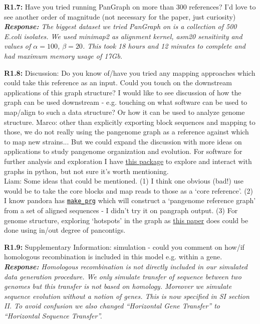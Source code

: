\documentclass[aps,rmp,onecolumn]{revtex4-1}
\newcommand{\Marco}[1]{{\color{gray}Marco: #1}}
\newcommand{\Liam}[1]{{\color{teal}Liam: #1}}
\newcommand{\reviewer}[2]{\textbf{#1:} #2\vskip 5mm}
\newcommand{\response}[1]{{\it {\color{response}\textbf{Response:} #1}}\vskip 5mm}
\begin{document}
\reviewer{R1.7}{Have you tried running PanGraph on more than 300 references? I'd love to see another order of magnitude (not necessary for the paper, just curiosity)}
\response{The biggest dataset we tried PanGraph on is a collection of 500 E.coli isolates. We used minimap2 as alignment kernel, asm20 sensitivity and values of $\alpha = 100$, $\beta=20$. This took 18 hours and 12 minutes to complete and had maximum memory usage of 17Gb.}

\reviewer{R1.8}{Discussion: Do you know of/have you tried any mapping approaches which could take this reference as an input. Could you touch on the downstream applications of this graph structure? I would like to see discussion of how the graph can be used downstream - e.g. touching on what software can be used to map/align to such a data structure? Or how it can be used to analyze genome structure.}
\Marco{other than explicitly exporting block sequences and mapping to those, we do not really using the pangenome graph as a reference against which to map new strains... But we could expand the discussion with more ideas on applications to study pangenome organization and evolution. For software for further analysis and exploration I have \href{https://github.com/mmolari/pypangraph}{this package} to explore and interact with graphs in python, but not sure it's worth mentioning.}\\
\Liam{Some ideas that could be mentioned. (1) I think one obvious (bad!) use would be to take the core blocks and map reads to those as a `core reference'. (2) I know pandora has \href{https://github.com/iqbal-lab-org/make_prg/}{\texttt{make\_prg}} which will construct a `pangenome reference graph' from a set of aligned sequences - I didn't try it on pangraph output. (3) For genome structure, exploring `hotspots' in the graph as \href{https://www.nature.com/articles/s41467-017-00808-w}{this paper} does could be done using in/out degree of pancontigs.}

\reviewer{R1.9}{Supplementary Information: simulation - could you comment on how/if homologous recombination is included in this model e.g. within a gene.}
\response{Homologous recombination is not directly included in our simulated data generation procedure. We only simulate transfer of sequence between two genomes but this transfer is not based on homology. Moreover we simulate sequence evolution without a notion of genes. This is now specified in SI section II. To avoid confusion we also changed ``Horizontal Gene Transfer'' to ``Horizontal Sequence Transfer''.}
\end{document}
